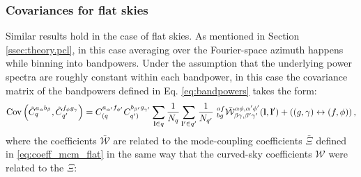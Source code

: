 \documentclass[a4paper,11pt]{article}
\begin{document}
      \subsubsection{Covariances for flat skies}
        Similar results hold in the case of flat skies. As mentioned in Section \ref{ssec:theory.pcl}, in this case averaging over the Fourier-space azimuth happens while binning into bandpowers. Under the assumption that the underlying power spectra are roughly constant within each bandpower, in this case the covariance matrix of the bandpowers defined in Eq. \ref{eq:bandpowers} takes the form:
        \begin{equation}\label{eq:cov_flat}
          {\rm Cov}\left(\tilde{C}^{a_\alpha b_\beta}_q,\tilde{C}^{f_\phi g_\gamma}_{q'}\right) = C^{a_{\alpha'} f_{\phi'}}_{(q}C^{b_{\beta'} g_{\gamma'}}_{q')}\sum_{{\bf l}\in q} \frac{1}{N_q} \sum_{{\bf l}' \in q'} \frac{1}{N_{q'}}\,\,^{af}_{bg}\bar{\mathcal{W}}^{\alpha\phi,\alpha'\phi'}_{\beta\gamma,\beta'\gamma'}({\bf l},{\bf l}')+\left((g,\gamma)\leftrightarrow(f,\phi)\right),
        \end{equation}
        where the coefficients $\bar{\mathcal{W}}$ are related to the mode-coupling coefficients $\bar{\Xi}$ defined in \ref{eq:coeff_mcm_flat} in the same way that the curved-sky coefficients $\mathcal{W}$ were related to the $\Xi$:
\end{document}
